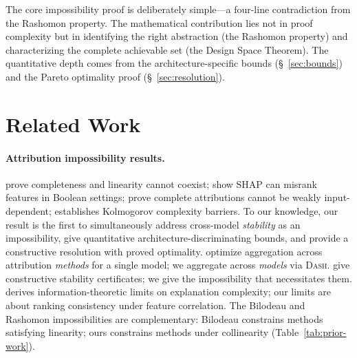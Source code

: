 \documentclass{jmlr}
\newcommand{\DASH}{\textsc{Dash}}
\begin{document}
The core impossibility proof is deliberately simple---a four-line contradiction from the Rashomon property.
The mathematical contribution lies not in proof complexity but in identifying the right abstraction (the Rashomon property) and characterizing the complete achievable set (the Design Space Theorem).
The quantitative depth comes from the architecture-specific bounds (\S~\ref{sec:bounds}) and the Pareto optimality proof (\S~\ref{sec:resolution}).


\section{Related Work}
\label{sec:related}

\paragraph{Attribution impossibility results.}
\citet{bilodeau2024impossibility} prove completeness and linearity cannot coexist; \citet{huang2024failings} show SHAP can misrank features in Boolean settings; \citet{srinivas2019full} prove complete attributions cannot be weakly input-dependent; \citet{rao2025limits} establishes Kolmogorov complexity barriers.
To our knowledge, our result is the first to simultaneously address cross-model \emph{stability} as an impossibility, give quantitative architecture-discriminating bounds, and provide a constructive resolution with proved optimality.
\citet{decker2024provably} optimize aggregation across attribution \emph{methods} for a single model; we aggregate across \emph{models} via \DASH{}.
\citet{jin2025probabilistic} give constructive stability certificates; we give the impossibility that necessitates them.
\citet{noguer2025mathematical} derives information-theoretic limits on explanation complexity; our limits are about ranking consistency under feature correlation.
The Bilodeau and Rashomon impossibilities are complementary: Bilodeau constrains methods satisfying linearity; ours constrains methods under collinearity (Table~\ref{tab:prior-work}).
\end{document}
